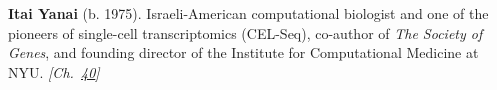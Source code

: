 \textbf{Itai Yanai} (b. 1975). Israeli-American computational biologist and one of the pioneers of single-cell transcriptomics (CEL-Seq), co-author of \textit{The Society of Genes}, and founding director of the Institute for Computational Medicine at NYU. \emph{[Ch.~\hyperref[ch:dnasequencing]{40}]}

